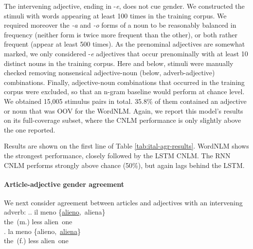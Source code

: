 The intervening adjective, ending in -\emph{e}, does not cue
gender. We constructed the stimuli with words appearing at least 100
times in the training corpus. We required moreover the \emph{-a}
and \emph{-o} forms of a noun to be reasonably balanced in frequency
(neither form is twice more frequent than the other), or both rather
frequent (appear at least 500 times). As the prenominal adjectives are
somewhat marked, we only considered -\emph{e} adjectives that occur
prenominally with at least 10 distinct nouns in the training corpus.
Here and below, stimuli were manually checked removing nonsensical
adjective-noun (below, adverb-adjective) combinations. Finally, adjective-noun combinations that
occurred in the training corpus were excluded, so that an n-gram
baseline would perform at chance level. We obtained 15,005 stimulus
pairs in total. %
35.8\% of them contained an adjective or noun that was
OOV for the WordNLM. Again, we report this model's results on its
full-coverage subset, where the CNLM performance is only slightly above
the one reported.

Results are shown on the first line of
Table \ref{tab:ital-agr-results}.  WordNLM shows the strongest
performance, closely followed by the LSTM CNLM.  The RNN CNLM
performs strongly above chance (50\%), but again lags behind the LSTM.

\paragraph{Article-adjective gender agreement}
We next consider agreement between articles and adjectives with an intervening adverb:
\ex.\ag. il meno \{\underline{alieno},\ aliena\} \\
the\ (m.) less alien\ one \\
\bg. la meno \{alieno,\ \underline{aliena}\} \\
the\ (f.) less alien\ one \\

